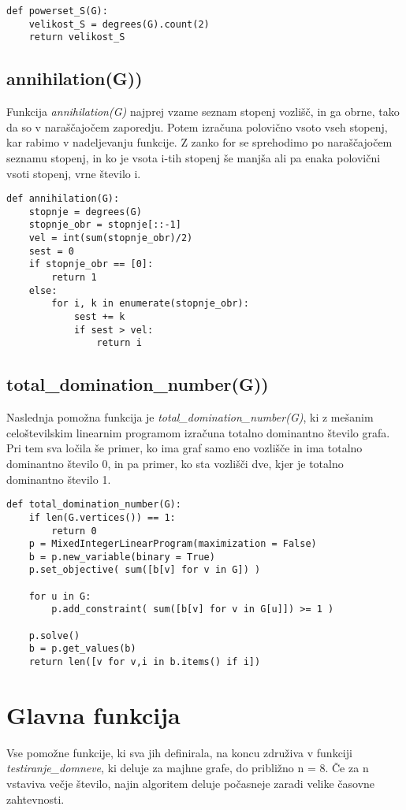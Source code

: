 \documentclass[11pt, a4paper]{article}
\begin{document}
\begin{verbatim}
def powerset_S(G):
    velikost_S = degrees(G).count(2)
    return velikost_S
\end{verbatim}

\subsection{\textbf{annihilation(G))}}
Funkcija \textit{annihilation(G)} najprej vzame seznam stopenj vozlišč, in ga obrne, tako da so v naraščajočem zaporedju. Potem izračuna polovično vsoto vseh stopenj, kar rabimo v nadeljevanju funkcije. Z zanko for se sprehodimo po naraščajočem seznamu stopenj, in ko je vsota i-tih stopenj še manjša ali pa enaka polovični vsoti stopenj, vrne število i. 

\begin{verbatim}
def annihilation(G):
    stopnje = degrees(G)
    stopnje_obr = stopnje[::-1]
    vel = int(sum(stopnje_obr)/2)
    sest = 0
    if stopnje_obr == [0]: 
        return 1
    else:
        for i, k in enumerate(stopnje_obr):
            sest += k
            if sest > vel:
                return i
\end{verbatim}

\subsection{\textbf{total\_domination\_number(G))}}
Naslednja pomožna funkcija je \textit{total\_domination\_number(G)}, ki z mešanim celoštevilskim linearnim programom izračuna totalno dominantno število grafa. Pri tem sva ločila še primer, ko ima graf samo eno vozlišče in ima totalno dominantno število 0, in pa primer, ko sta vozlišči dve, kjer je totalno dominantno število 1.

\begin{verbatim}
def total_domination_number(G):
    if len(G.vertices()) == 1:
        return 0
    p = MixedIntegerLinearProgram(maximization = False)
    b = p.new_variable(binary = True)
    p.set_objective( sum([b[v] for v in G]) )

    for u in G:
        p.add_constraint( sum([b[v] for v in G[u]]) >= 1 )

    p.solve()
    b = p.get_values(b)
    return len([v for v,i in b.items() if i])
\end{verbatim}

\section{\textbf{Glavna funkcija}}
Vse pomožne funkcije, ki sva jih definirala, na koncu združiva v funkciji \textit{testiranje\_domneve}, ki deluje za majhne grafe, do približno n = 8. Če za n vstaviva večje število, najin algoritem deluje počasneje zaradi velike časovne zahtevnosti. 
\end{document}
